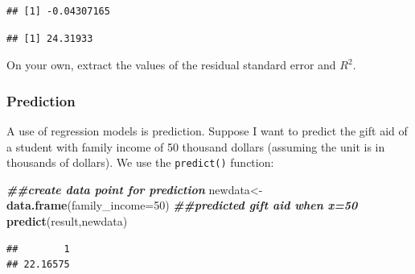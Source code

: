 \documentclass[
]{book}
\newenvironment{Shaded}{\begin{snugshade}}{\end{snugshade}}
\newcommand{\AttributeTok}[1]{\textcolor[rgb]{0.13,0.29,0.53}{#1}}
\newcommand{\DecValTok}[1]{\textcolor[rgb]{0.00,0.00,0.81}{#1}}
\newcommand{\DocumentationTok}[1]{\textcolor[rgb]{0.56,0.35,0.01}{\textbf{\textit{#1}}}}
\newcommand{\FunctionTok}[1]{\textcolor[rgb]{0.13,0.29,0.53}{\textbf{#1}}}
\newcommand{\NormalTok}[1]{#1}
\newcommand{\OtherTok}[1]{\textcolor[rgb]{0.56,0.35,0.01}{#1}}
\newcommand{\SpecialCharTok}[1]{\textcolor[rgb]{0.81,0.36,0.00}{\textbf{#1}}}
\begin{document}
\begin{Shaded}
\end{Shaded}

\begin{verbatim}
## [1] -0.04307165
\end{verbatim}

\begin{Shaded}
\end{Shaded}

\begin{verbatim}
## [1] 24.31933
\end{verbatim}

On your own, extract the values of the residual standard error and \(R^2\).

\hypertarget{prediction}{%
\subsubsection*{Prediction}\label{prediction}}

A use of regression models is prediction. Suppose I want to predict the gift aid of a student with family income of 50 thousand dollars (assuming the unit is in thousands of dollars). We use the \texttt{predict()} function:

\begin{Shaded}
\begin{Highlighting}[]
\DocumentationTok{\#\#create data point for prediction}
\NormalTok{newdata}\OtherTok{\textless{}{-}}\FunctionTok{data.frame}\NormalTok{(}\AttributeTok{family\_income=}\DecValTok{50}\NormalTok{)}
\DocumentationTok{\#\#predicted gift aid when x=50}
\FunctionTok{predict}\NormalTok{(result,newdata)}
\end{Highlighting}
\end{Shaded}

\begin{verbatim}
##        1 
## 22.16575
\end{verbatim}
\end{document}
